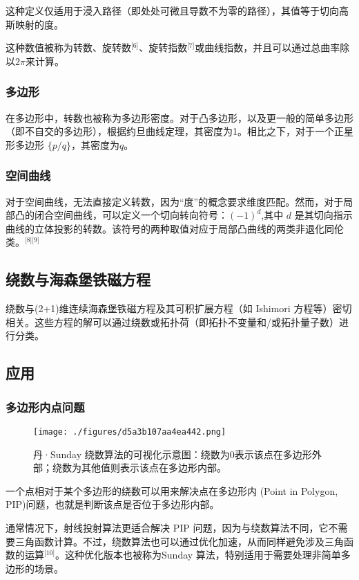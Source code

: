 这种定义仅适用于浸入路径（即处处可微且导数不为零的路径），其值等于切向高斯映射的度。

这种数值被称为转数、旋转数\(^\text{[6]}\)、旋转指数\(^\text{[7]}\)或曲线指数，并且可以通过总曲率除以$2\pi$来计算。
\subsubsection{多边形}
在多边形中，转数也被称为多边形密度。对于凸多边形，以及更一般的简单多边形（即不自交的多边形），根据约旦曲线定理，其密度为1。相比之下，对于一个正星形多边形 $\{p/q\}$，其密度为$q$。
\subsubsection{空间曲线}
对于空间曲线，无法直接定义转数，因为“度”的概念要求维度匹配。然而，对于局部凸的闭合空间曲线，可以定义一个切向转向符号：$(-1)^d$,其中 $d$ 是其切向指示曲线的立体投影的转数。该符号的两种取值对应于局部凸曲线的两类非退化同伦类。\(^\text{[8][9]}\)
\subsection{绕数与海森堡铁磁方程}
绕数与(2+1)维连续海森堡铁磁方程及其可积扩展方程（如 Ishimori 方程等）密切相关。这些方程的解可以通过绕数或拓扑荷（即拓扑不变量和/或拓扑量子数）进行分类。
\subsection{应用}
\subsubsection{多边形内点问题}
\begin{figure}[ht]
\centering
\texttt{[image: ./figures/d5a3b107aa4ea442.png]}
\caption{丹·Sunday 绕数算法的可视化示意图：绕数为0表示该点在多边形外部；绕数为其他值则表示该点在多边形内部。} \label{fig_JRS_4}
\end{figure}
一个点相对于某个多边形的绕数可以用来解决点在多边形内 (Point in Polygon, PIP)问题，也就是判断该点是否位于多边形内部。

通常情况下，射线投射算法更适合解决 PIP 问题，因为与绕数算法不同，它不需要三角函数计算。不过，绕数算法也可以通过优化加速，从而同样避免涉及三角函数的运算\(^\text{[10]}\)。这种优化版本也被称为Sunday 算法，特别适用于需要处理非简单多边形的场景。
